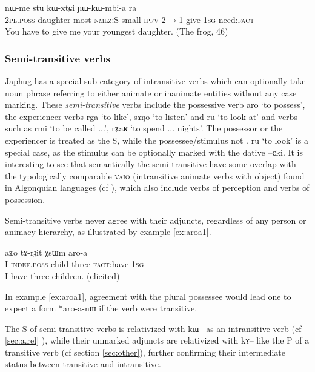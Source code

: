 \documentclass[oldfontcommands,oneside,a4paper,11pt]{article}
\newcommand{\ipa}[1]{{\phon #1}} %
\begin{document}
 \begin{exe}
   \ex   \label{ex:YWkWmbia}
 \gll 
\ipa{nɯ-me}  	\ipa{stu}  	\ipa{kɯ-xtɕi}  	\ipa{ɲɯ-kɯ-mbi-a}  	\ipa{ra}  \\
\textsc{2pl.poss}-daughter most \textsc{nmlz}:S-small \textsc{ipfv}-2$\rightarrow$1-give-\textsc{1sg} need:\textsc{fact} \\
\glt You have to give me your youngest daughter.  (The frog, 46)
   \end{exe}  

   
   
\subsubsection{Semi-transitive verbs} \label{sec:semi.tr}
  Japhug has a special sub-category of intransitive verbs which can optionally take  noun phrase referring to either animate or inanimate entities without any case marking.   These  \textit{semi-transitive} verbs   include the possessive verb \ipa{aro} `to possess', the experiencer verbs \ipa{rga} `to like', \ipa{sɤŋo} `to listen' and \ipa{ru} `to look at' and verbs such as \ipa{rmi} `to be called ...', \ipa{rʑaʁ} `to spend ... nights'. The possessor or the experiencer is treated as the S, while the possessee/stimulus not . \ipa{ru} `to look' is a special case, as the stimulus can be optionally marked with the dative \ipa{--ɕki}. It is interesting to see that semantically the semi-transitive have some overlap with the typologically  comparable \textsc{vaio} (intransitive animate verbs with object) found in Algonquian languages (cf  \citealt[242]{valentine01grammar}), which also include verbs of perception and verbs of possession.

Semi-transitive verbs never agree with their adjuncts, regardless of any person or animacy hierarchy, as illustrated by example \ref{ex:aroa1}.


 \begin{exe}
   \ex   \label{ex:aroa1}
 \gll 
\ipa{aʑo}  	\ipa{tɤ-rɟit}  	\ipa{χsɯm}  	\ipa{aro-a}   \\
I \textsc{indef.poss}-child three \textsc{fact:}have-\textsc{1sg} \\
 \glt   I have three children. (elicited)
   \end{exe} 

 
In example \ref{ex:aroa1}, agreement with the plural possessee would lead one to expect a form *\ipa{aro-a-nɯ} if the verb were transitive.

The S of semi-transitive verbs is relativized with \ipa{kɯ}-- as an intransitive verb (cf  \ref{sec:a.rel} ), while their unmarked adjuncts are relativized with \ipa{kɤ--} like the P of a transitive verb (cf section \ref{sec:other}), further confirming their intermediate status between transitive and intransitive.
\end{document}
